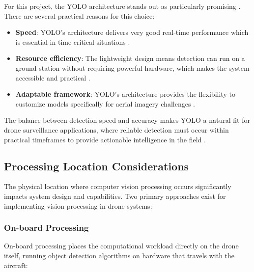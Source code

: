 For this project, the YOLO architecture stands out as particularly promising \cite{Ly2019}. There are several practical reasons for this choice:

\begin{itemize}
    \item \textbf{Speed}: YOLO's architecture delivers very good real-time performance which is essential in time critical situations \cite{Tijtgat2017}.
    
    \item \textbf{Resource efficiency}: The lightweight design means detection can run on a ground station without requiring powerful hardware, which makes the system accessible and practical \cite{Wu2019}.
    
    \item \textbf{Adaptable framework}: YOLO's architecture provides the flexibility to customize models specifically for aerial imagery challenges \cite{Benjumea2021}.
\end{itemize}

The balance between detection speed and accuracy makes YOLO a natural fit for drone surveillance applications, where reliable detection must occur within practical timeframes to provide actionable intelligence in the field \cite{Kyrkou2019}.

\subsection{Processing Location Considerations}

The physical location where computer vision processing occurs significantly impacts system design and capabilities. Two primary approaches exist for implementing vision processing in drone systems:

\subsubsection{On-board Processing}

On-board processing places the computational workload directly on the drone itself, running object detection algorithms on hardware that travels with the aircraft:

